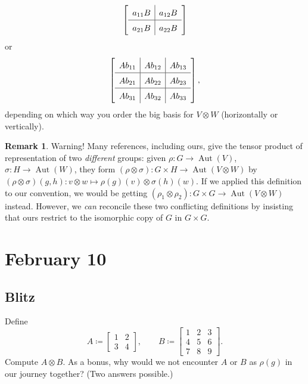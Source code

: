 \documentclass[12pt]{article}
\newcommand{\ita}[1]{\textit{#1}}
\theoremstyle{definition}
\newtheorem*{remark}{Remark}
\DeclareMathOperator\Aut{Aut}
\begin{document}
\begin{enumerate}
\begin{equation}
        \def\arraystretch{1.5}
        \left[\begin{array}{c | c}
            a_{11}B & a_{12}B  \\
            \hline 
            a_{21}B & a_{22}B  
        \end{array}\right]
    \end{equation}
    or 
    \begin{equation}
        \def\arraystretch{1.5}
        \left[\begin{array}{c | c | c}
            Ab_{11} & Ab_{12} & Ab_{13} \\
            \hline
            Ab_{21} & Ab_{22} & Ab_{23} \\
            \hline
            Ab_{31} & Ab_{32} & Ab_{33}
        \end{array}\right],
    \end{equation}
    depending on which way you order the big basis for $V\otimes W$ (horizontally or vertically).
    \begin{remark}
        Warning! Many references, including ours, give the tensor product of representation of two \ita{different} groups: given $\rho:G\to\Aut(V)$, $\sigma:H\to\Aut(W)$, they form $(\rho\otimes\sigma):G\times H\to\Aut(V\otimes W)$ by $(\rho\otimes\sigma)(g,h):v\otimes w\mapsto\rho(g)(v)\otimes\sigma(h)(w)$. If we applied this definition to our convention, we would be getting $(\rho_1\otimes\rho_2):G\times G\to\Aut(V\otimes W)$ instead. However, we \ita{can} reconcile these two conflicting definitions by insisting that ours restrict to the isomorphic copy of $G$ in $G\times G$. 
    \end{remark}
\end{enumerate}
\section{February 10}
\subsection{Blitz}
Define 
\[A\coloneqq 
\begin{bmatrix}
    1 & 2 \\
    3 & 4
\end{bmatrix},
\qquad
B\coloneqq 
\begin{bmatrix}
    1 & 2 & 3 \\
    4 & 5 & 6 \\
    7 & 8 & 9
\end{bmatrix}.
\]
Compute $A\otimes B$. As a bonus, why would we not encounter $A$ or $B$ as $\rho(g)$ in our journey together? (Two answers possible.) 
\end{document}
